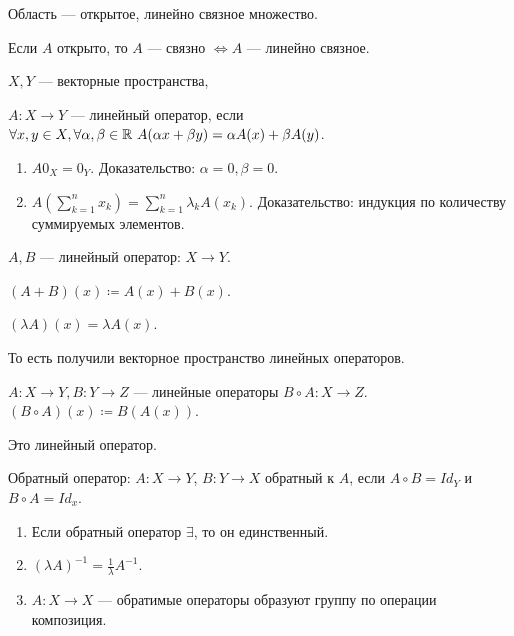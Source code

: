 \begin{definition}
    Область --- открытое, линейно связное множество.
\end{definition}
\begin{remark}
    Если $A$ открыто, то  $A$ --- связно  $\iff A$ --- линейно связное.
\end{remark}
\begin{definition}
    $X, Y$ --- векторные пространства,  

    $A\!: X \to Y$ --- линейный оператор, если $\forall x, y \in X, \forall \alpha, \beta \in \mathbb{R}\ A(\alpha x + \beta y) = \alpha A(x) + \beta A(y)$.
\end{definition}
\begin{properties}
\begin{enumerate}
    \item $A 0_X = 0_Y$. Доказательство: $\alpha = 0, \beta = 0$.
    \item $A (\sum\limits_{k=1}^n x_k) = \sum\limits_{k=1}^n \lambda_k A(x_k)$. Доказательство: индукция по количеству суммируемых элементов.
\end{enumerate}
\end{properties}
\begin{definition}
    $A, B$ --- линейный оператор:  $X \to Y$.

     $(A+B)(x) \coloneqq A(x) + B(x)$.

      $(\lambda A)(x) = \lambda A(x)$. 

      То есть получили векторное пространство линейных операторов.
\end{definition}
\begin{definition}
    $A\!: X \to Y, B\!: Y \to Z$ --- линейные операторы  $B \circ A\!: X \to Z$.  $(B \circ A)(x) \coloneqq B(A(x))$.
\end{definition}
\begin{remark}
    Это линейный оператор.
\end{remark}
\begin{definition}
    Обратный оператор: $A\!: X \to Y$,  $B\!: Y \to X$ обратный к  $A$, если  $A \circ B = Id_Y$ и  $B \circ A = Id_x$.
\end{definition}
\begin{properties}
    \begin{enumerate}
        \item Если обратный оператор $\exists$, то он единственный.
        \item  $(\lambda A)^{-1} = \frac{1}{\lambda} A^{-1}$.
        \item $A\!: X \to X$ --- обратимые операторы образуют группу по операции композиция.
    \end{enumerate}
\end{properties}

